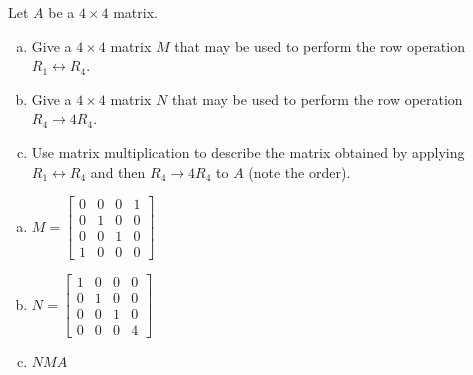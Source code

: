 
\begin{exerciseStatement}


Let \(A\) be a \(4 \times 4\) matrix.


\begin{enumerate}[(a)]
\item Give a \(4 \times 4\) matrix \(M\) that may be used to perform the row operation \( R_1 \leftrightarrow R_4 \).
\item Give a \(4 \times 4\) matrix \(N\) that may be used to perform the row operation \( R_4 \to 4R_4 \).
\item Use matrix multiplication to describe the matrix obtained by applying \( R_1 \leftrightarrow R_4 \) and then \( R_4 \to 4R_4 \) to \(A\) (note the order). 
\end{enumerate}
    
\end{exerciseStatement}
    
\begin{exerciseAnswer} 

\begin{enumerate}[(a)]
\item \(M= \left[\begin{array}{cccc}
0 & 0 & 0 & 1 \\
0 & 1 & 0 & 0 \\
0 & 0 & 1 & 0 \\
1 & 0 & 0 & 0
\end{array}\right] \)
\item \(N= \left[\begin{array}{cccc}
1 & 0 & 0 & 0 \\
0 & 1 & 0 & 0 \\
0 & 0 & 1 & 0 \\
0 & 0 & 0 & 4
\end{array}\right] \)
\item \(NMA\)
\end{enumerate}
    
\end{exerciseAnswer}
    
